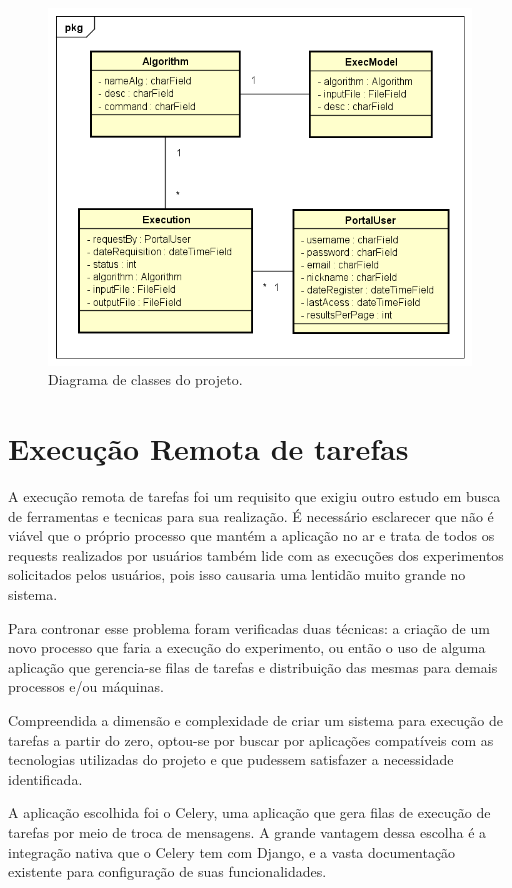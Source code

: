 \documentclass[tg]{mdtufsm}
\begin{document}
\begin{figure}
	\centering
	\includegraphics[width=1\textwidth]{class_diagran_tg}
	\caption{
		Diagrama de classes do projeto.
	}
	\label{fig:path_tracing}
\end{figure}


\section{Execução Remota de tarefas}
A execução remota de tarefas foi um requisito que exigiu outro estudo em busca de ferramentas e tecnicas para sua realização. É necessário esclarecer que não é viável que o próprio processo que mantém a aplicação no ar e trata de todos os requests realizados por usuários também lide com as execuções dos experimentos solicitados pelos usuários, pois isso causaria uma lentidão muito grande no sistema.

Para contronar esse problema foram verificadas duas técnicas: a criação de um novo processo que faria a execução do experimento, ou então o uso de alguma aplicação que gerencia-se filas de tarefas e distribuição das mesmas para demais processos e/ou máquinas.

Compreendida a dimensão e complexidade de criar um sistema para execução de tarefas a partir do zero, optou-se por buscar por aplicações compatíveis com as tecnologias utilizadas do projeto e que pudessem satisfazer a necessidade identificada.

A aplicação escolhida foi o Celery, uma aplicação que gera filas de execução de tarefas por meio de troca de mensagens. A grande vantagem dessa escolha é a integração nativa que o Celery tem com Django, e a vasta documentação existente para configuração de suas funcionalidades.
\end{document}
